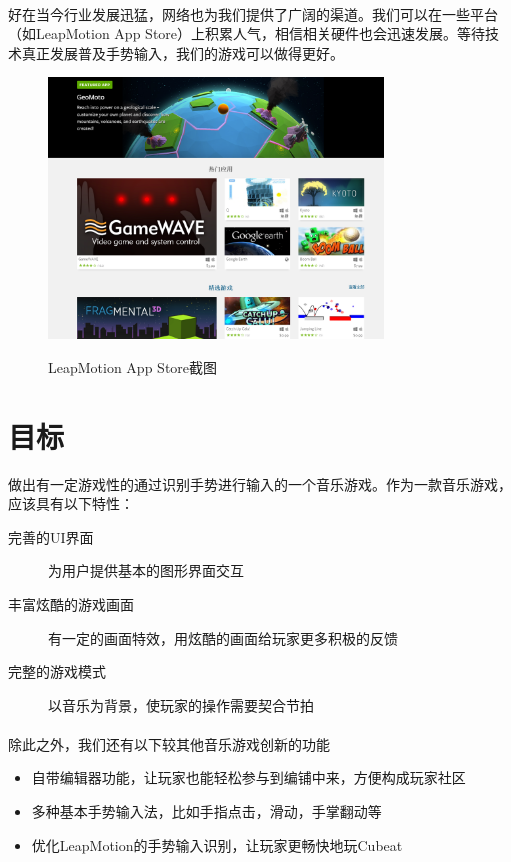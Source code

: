 \documentclass{article} \usepackage{CJK}
\begin{document}
\paragraph{}
好在当今行业发展迅猛，网络也为我们提供了广阔的渠道。我们可以在一些平台（如LeapMotion App Store）上积累人气，相信相关硬件也会迅速发展。等待技术真正发展普及手势输入，我们的游戏可以做得更好。
\begin{figure}[H]
  \centering
  \includegraphics[width=24em]{leapMotionAppStore.png}\\
  \caption{LeapMotion App Store截图}\label{3-4}
\end{figure} 
\newpage
\section{目标}
做出有一定游戏性的通过识别手势进行输入的一个音乐游戏。作为一款音乐游戏，应该具有以下特性：
\begin{description}
  \item[完善的UI界面] 为用户提供基本的图形界面交互
  \item[丰富炫酷的游戏画面] 有一定的画面特效，用炫酷的画面给玩家更多积极的反馈
  \item[完整的游戏模式] 以音乐为背景，使玩家的操作需要契合节拍
\end{description}
\paragraph{}
除此之外，我们还有以下较其他音乐游戏创新的功能
\begin{itemize}
  \item 自带编辑器功能，让玩家也能轻松参与到编铺中来，方便构成玩家社区
  \item 多种基本手势输入法，比如手指点击，滑动，手掌翻动等
  \item 优化LeapMotion的手势输入识别，让玩家更畅快地玩Cubeat
\end{itemize}
\end{document}
